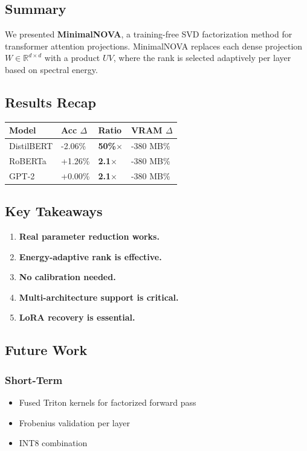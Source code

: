 \subsection{Summary}

We presented \textbf{MinimalNOVA}, a training-free SVD factorization method for 
transformer attention projections. MinimalNOVA replaces each dense projection 
$W \in \mathbb{R}^{d \times d}$ with a product $U V$, where the rank is 
selected adaptively per layer based on spectral energy.

\subsection{Results Recap}

\begin{table}[H]
\centering
\small
\begin{tabular}{llll}
\toprule
\textbf{Model} & \textbf{Acc $\Delta$} & \textbf{Ratio} & \textbf{VRAM $\Delta$} \\
\midrule
DistilBERT & -2.06\% & \textbf{50\%$\times$} & -380 MB\% \\
RoBERTa & +1.26\% & \textbf{2.1$\times$} & -380 MB\% \\
GPT-2 & +0.00\% & \textbf{2.1$\times$} & -380 MB\% \\
\bottomrule
\end{tabular}
\end{table}

\subsection{Key Takeaways}

\begin{enumerate}
\item \textbf{Real parameter reduction works.}
\item \textbf{Energy-adaptive rank is effective.}
\item \textbf{No calibration needed.}
\item \textbf{Multi-architecture support is critical.}
\item \textbf{LoRA recovery is essential.}

\end{enumerate}
\subsection{Future Work}

\subsubsection{Short-Term}
\begin{itemize}
\item Fused Triton kernels for factorized forward pass
\item Frobenius validation per layer
\item INT8 combination

\end{itemize}
